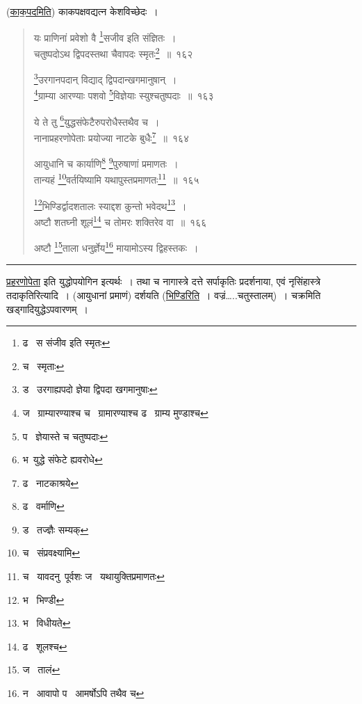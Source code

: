 \documentclass[11pt, openany]{book}
\begin{document}
\vspace{2mm}
(\underline{काक॒पदमिति}) काकपक्षवद्यत्न केशविच्छेदः~। 

\newpage

\begin{quote}
{\na यः प्राणिनां प्रवेशो वै \renewcommand{\thefootnote}{1}\footnote{ढ \textendash\ स संजीव इति स्मृतः}सजीव इति संज्ञितः~।\\
चतुष्पदोऽथ द्विपदस्तथा चैवापदः स्मृतः\renewcommand{\thefootnote}{2}\footnote{च \textendash\ स्मृताः}~॥~१६२

\renewcommand{\thefootnote}{3}\footnote{ड \textendash\ उरगाह्यपदो ज्ञेया द्विपदा खगमानुषाः}उरगानपदान् विद्याद् द्विपदान्खगमानुषान्~।\\
\renewcommand{\thefootnote}{4}\footnote{ज \textendash\ ग्राम्यारण्याश्च च \textendash\ ग्रामारण्याश्च ढ \textendash\ ग्राम्य मुण्डाश्च}ग्राम्या आरण्याः पशवो \renewcommand{\thefootnote}{5}\footnote{प \textendash\ ज्ञेयास्ते च चतुष्पदाः}विज्ञेयाः स्युश्चतुष्पदाः~॥~१६३

ये ते तु \renewcommand{\thefootnote}{6}\footnote{भ\textendash\ युद्धे संफेटे ह्यवरोधे}युद्धसंफेटैरुपरोधैस्तथैव च~।\\
नानाप्रहरणोपेताः प्रयोज्या नाटके बुधैः\renewcommand{\thefootnote}{7}\footnote{ढ \textendash\ नाटकाश्रये}~॥~१६४

आयुधानि च कार्याणि\renewcommand{\thefootnote}{8}\footnote{ढ \textendash\ वर्माणि} \renewcommand{\thefootnote}{9}\footnote{ड \textendash\ तज्ज्ञैः सम्यक्}पुरुषाणां प्रमाणतः~।\\
तान्यहं \renewcommand{\thefootnote}{10}\footnote{च \textendash\ संप्रवक्ष्यामि}वर्तयिष्यामि यथापुस्तप्रमाणतः\renewcommand{\thefootnote}{11}\footnote{च \textendash\ यावदनु\textendash\ पूर्वशः ज \textendash\ यथायुक्तिप्रमाणतः}~॥~१६५

\renewcommand{\thefootnote}{12}\footnote{भ \textendash\ भिण्डी}भिण्डिर्द्वादशतालः स्याद्दश कुन्तो भवेदथ\renewcommand{\thefootnote}{13}\footnote{भ \textendash\ विधीयते}~।\\
अष्टौ शतघ्नी शूलं\renewcommand{\thefootnote}{14}\footnote{ढ \textendash\ शूलश्च} च तोमरः शक्तिरेव वा~॥~१६६

अष्टौ \renewcommand{\thefootnote}{15}\footnote{ज \textendash\ तालं}ताला धनुर्ज्ञेय\renewcommand{\thefootnote}{16}\footnote{न \textendash\ आवापो प \textendash\ आमर्षोऽपि तथैव च} मायामोऽस्य द्विहस्तकः~।}
\end{quote}

\hrule

\vspace{2mm}
\underline{प्रहरणोपेता} इति युद्धोपयोगिन इत्यर्थः~। तथा च नागास्त्रे दत्ते सर्पाकृतिः प्रदर्शनाया, एवं नृसिंहास्त्रे तदाकृतिरित्यादि~। (आयुधानां प्रमाणं) दर्शयति (\underline{भिण्डिरिति}~। वज्रं\ldots ..चतुस्तालम्)~। चक्रमिति खड्गादियुद्धेऽपवारणम्~।
\end{document}
